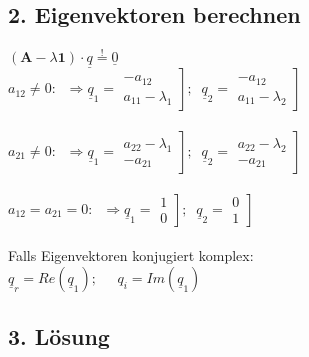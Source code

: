 \documentclass[6pt,a4paper]{scrartcl}
\newcommand{\mustbe}{\stackrel{!}{=}}
\begin{document}
\begin{multicols*}{4}
    \subsection*{2. Eigenvektoren berechnen}
    $(\textbf{A}-\lambda \textbf{1})\cdot \underline{q}\mustbe \underline{0}$\\
    $a_{12}\ne 0:\;\;\Rightarrow \underline{q}_1=\left.\begin{matrix}-a_{12} \\ a_{11}-\lambda_1\end{matrix}\right];\;\; \underline{q}_2=\left.\begin{matrix}-a_{12} \\ a_{11}-\lambda_2\end{matrix}\right]$\\\\
    $a_{21}\ne 0:\;\;\Rightarrow \underline{q}_1=\left.\begin{matrix}a_{22}-\lambda_1 \\ -a_{21}\end{matrix}\right];\;\; \underline{q}_2=\left.\begin{matrix}a_{22}-\lambda_2 \\ -a_{21}\end{matrix}\right]$\\\\
    $a_{12}=a_{21}= 0:\;\;\Rightarrow \underline{q}_1=\left.\begin{matrix}1 \\ 0\end{matrix}\right];\;\; \underline{q}_2=\left.\begin{matrix}0 \\ 1\end{matrix}\right]$\\\\
    Falls Eigenvektoren konjugiert komplex:\\
    $\underline{q}_r=Re(\underline{q}_1);\;\;\;\;\;q_i=Im(\underline{q}_1)$
    \subsection*{3. Lösung}

\end{multicols*}
\end{document}
